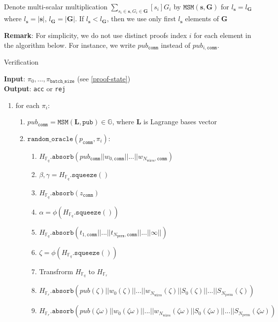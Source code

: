 Denote multi-scalar multiplication $\sum\limits_{s_i \in \textbf{s}, G_i \in \textbf{G}}[s_i]G_i$ by $\texttt{MSM}(\textbf{s}, \textbf{G})$ for $l_{\textbf{s}} = l_{\textbf{G}}$ where $l_{\textbf{s}} = |\textbf{s}|$, $l_{\textbf{G}} = |\textbf{G}|$. 
If $l_{\textbf{s}} < l_{\textbf{G}}$, then we use only first $l_{\textbf{s}}$ elements of $\textbf{G}$

\textbf{Remark}: For simplicity, we do not use distinct proofs index $i$ for each element in the algorithm below.
For instance, we write $pub_{\texttt{comm}}$ instead of $pub_{i, \texttt{comm}}$.
\begin{algorithm}[H]
\caption{Verification}
\textbf{Input}: $\pi_0, \dots, \pi_{\texttt{batch\_size}}$ (see \ref{proof-state}) \\
\textbf{Output}: \texttt{acc} or \texttt{rej}
\begin{enumerate}
	\item for each $\pi_i$:
	\begin{enumerate}
		\item $pub_{\texttt{comm}} = \texttt{MSM}(\textbf{L}, \texttt{pub}) \in \mathbb{G}$, where $\textbf{L}$ is Lagrange bases vector
		\item $\texttt{random\_oracle}(p_{\texttt{comm}}, \pi_i)$:
		\begin{enumerate}
			\item $H_{\mathbb{F}_q}.\texttt{absorb}(pub_{\texttt{comm}} || w_{0, \texttt{comm}} || ... || w_{N_{\text{wires}}, \texttt{comm}})$
			\item $\beta, \gamma = H_{\mathbb{F}_q}.\texttt{squeeze}()$
			\item $H_{\mathbb{F}_q}.\texttt{absorb}(z_{\texttt{comm}})$
			\item $\alpha = \phi(H_{\mathbb{F}_q}.\texttt{squeeze}())$
			\item $H_{\mathbb{F}_q}.\texttt{absorb}(t_{1, \texttt{comm}} ||  ... || t_{N_{\texttt{perm}}, \texttt{comm}} ||  ... || \infty ||)$
			\item $\zeta = \phi(H_{\mathbb{F}_q}.\texttt{squeeze}())$
			\item Transfrorm $H_{\mathbb{F}_q}$ to $H_{\mathbb{F}_r}$
			\item $H_{\mathbb{F}_r}.\texttt{absorb}(pub(\zeta) || w_{0}(\zeta) || ... || w_{N_{\text{wires}}}(\zeta) 
				|| S_0(\zeta) || ... || S_{N_{\text{perm}}}(\zeta))$
			\item $H_{\mathbb{F}_r}.\texttt{absorb}(pub(\zeta\omega) || w_{0}(\zeta\omega) || ... || w_{N_{\text{wires}}}(\zeta\omega) 
				|| S_0(\zeta\omega) || ... || S_{N_{\text{perm}}}(\zeta\omega))$

\end{enumerate}
\end{enumerate}
\end{enumerate}
\end{algorithm}

